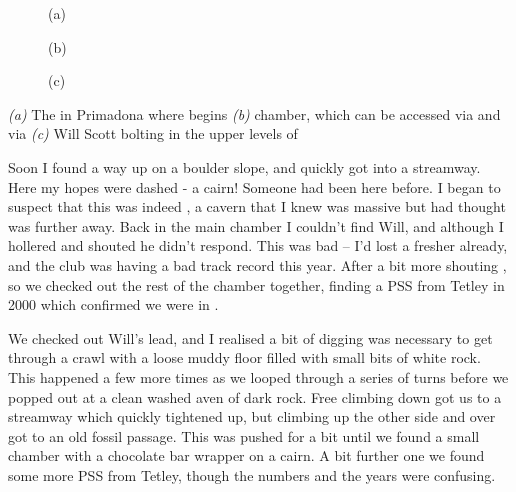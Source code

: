 \begin{pagefigure}
	\checkoddpage \ifoddpage \forcerectofloat \else \forceversofloat \fi
	\centering
	
   	\begin{subfigure}[t]{0.49\textwidth}
    	\centering
       	\caption{(a)} \label{The spiral climb}
    \end{subfigure}
    \hfill
	\begin{subfigure}[t]{0.49\textwidth}
		\centering
		 \caption{(b)}\label{Alkatraz}
	\end{subfigure}
    \vspace{0cm}
	
	\begin{subfigure}[h]{\textwidth}
		\centering
		\caption{(c)}\label{WS bolting}
	\end{subfigure}

         \caption{
   		\emph{(a)} The \protect{} in Primadona where \protect{} begins
     		\emph{(b)} \protect{} chamber, which can be accessed via \protect{} and \protect{} via \protect{}
     		\emph{(c)} Will Scott bolting in the upper levels of \protect{} 
		}
\end{pagefigure}

Soon I found a way up on a boulder slope, and quickly got into a streamway. Here my hopes were dashed - a cairn! Someone had been here before. I began to suspect that this was indeed , a cavern that I knew was massive but had thought was further away. Back in the main chamber I couldn't find Will, and although I hollered and shouted he didn't respond. This was bad -- I'd lost a fresher already, and the club was having a bad track record this year. After a bit more shouting , so we checked out the rest of the chamber together, finding a PSS from Tetley in 2000 which confirmed we were in .

We checked out Will's lead, and I realised a bit of digging was necessary to get through a crawl with a loose muddy floor filled with small bits of white rock. This happened a few more times as we looped through a series of turns before we popped out at a clean washed aven of dark rock. Free climbing down got us to a streamway which quickly tightened up, but climbing up the other side and over got to an old fossil passage. This was pushed for a bit until we found a small chamber with a chocolate bar wrapper on a cairn. A bit further one we found some more PSS from Tetley, though the numbers and the years were confusing.

